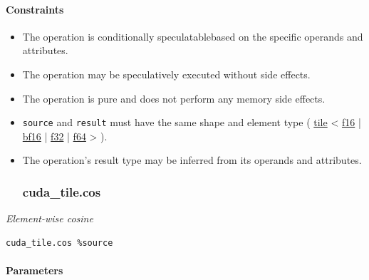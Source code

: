 \documentclass{article}
\begin{document}
\paragraph{Constraints}

\begin{itemize}
\item The operation is conditionally speculatablebased on the specific operands and attributes.
\item The operation may be speculatively executed without side effects.
\item The operation is pure and does not perform any memory side effects.
\item \texttt{source} and \texttt{result} must have the same shape and element type ( \href{https://docs.nvidia.com/cuda/tile-ir/latest/sections/types.html#type-tile}{tile} < \href{https://docs.nvidia.com/cuda/tile-ir/latest/sections/types.html#subsection-element-types}{f16} | \href{https://docs.nvidia.com/cuda/tile-ir/latest/sections/types.html#subsection-element-types}{bf16} | \href{https://docs.nvidia.com/cuda/tile-ir/latest/sections/types.html#subsection-element-types}{f32} | \href{https://docs.nvidia.com/cuda/tile-ir/latest/sections/types.html#subsection-element-types}{f64} > ).
\item The operation's result type may be inferred from its operands and attributes.


\subsubsection{cuda\_tile.cos}

\end{itemize}
\textit{Element-wise cosine}


\begin{lstlisting}
cuda_tile.cos %source
\end{lstlisting}

\paragraph{Parameters}
\end{document}
